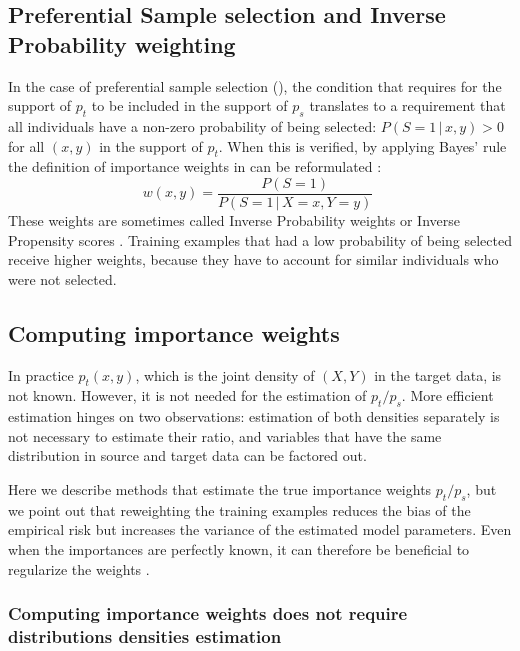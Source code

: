 \documentclass[twocolumn]{article}
\newcommand{\giv}{ \,|\, }
\begin{document}
\subsection{Preferential Sample selection and Inverse Probability weighting}

In the case of preferential sample selection
(), the condition that requires for the
support of \(p_t\) to be included in the support of \(p_s\) translates to a
requirement that all individuals have a non-zero probability of being selected:
\(P(S=1 \giv x,y) > 0\) for all \((x, y)\) in the support of \(p_t\).
%
When this is verified, by applying Bayes' rule the definition of importance
weights in  can be reformulated
\citep[see][Sec. 2.3]{cortes2008sample}:
\begin{equation}\label{eq:inverse-probability-weight-definition}
  w(x, y) = \frac{P(S=1)}{P(S=1 \giv X=x,Y=y)} \;
\end{equation}
%
These weights are sometimes called Inverse Probability weights
\citep{hernan2004structural} or Inverse Propensity scores
\citep{austin2011introduction}. Training examples that had a low probability of
being selected receive higher weights, because they have to account for similar
individuals who were not selected.
%

\subsection{Computing importance weights}

In practice \(p_t(x, y)\), which is the joint density of \((X,
Y)\) in the target data, is not known. However, it is not needed for the estimation of \(p_t / p_s\).
%
More efficient estimation hinges on two observations: estimation
of both densities separately is not necessary to estimate their ratio, and
variables that have the same distribution in source and target data can be factored out.

Here we describe methods that estimate the true importance weights \(p_t /
p_s\), but we point out that reweighting the training examples reduces the bias
of the empirical risk but increases the variance of the estimated model
parameters.
%
%
Even when the importances are perfectly known, it can therefore be beneficial to
regularize the weights \citep{shimodaira2000improving}.

\subsubsection{Computing importance weights does not require distributions
  densities estimation}\label{sec:no-density-estimation}
\end{document}
